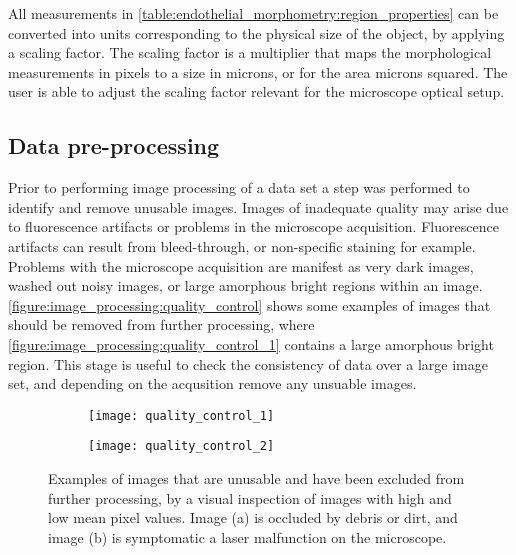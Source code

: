 All measurements in \autoref{table:endothelial_morphometry:region_properties} can be converted into units corresponding to the physical size of the object, by applying a scaling factor. The scaling factor is a multiplier that maps the morphological measurements in pixels to a size in microns, or for the area microns squared. The user is able to adjust the scaling factor relevant for the microscope optical setup.

\subsection{Data pre-processing}
\label{endothelial_morphometry:image_processing:data_preprocessing}
Prior to performing image processing of a data set a step was performed to identify and remove unusable images. Images of inadequate quality may arise due to fluorescence artifacts or problems in the microscope acquisition. Fluorescence artifacts can result from bleed-through, or non-specific staining for example. Problems with the microscope acquisition are manifest as very dark images, washed out noisy images, or large amorphous bright regions within an image. \autoref{figure:image_processing:quality_control} shows some examples of images that should be removed from further processing, where \autoref{figure:image_processing:quality_control_1} contains a large amorphous bright region. This stage is useful to check the consistency of data over a large image set, and depending on the acqusition remove any unsuable images.

\begin{figure}[htbp]\centering
	\begin{subfigure}[b]{0.49\linewidth} %
		\centering
		\texttt{[image: quality\_control\_1]}
		\caption{}
		\label{figure:image_processing:quality_control_1}
		\vspace{1ex} \end{subfigure} \begin{subfigure}[b]{0.49\linewidth} %
		\centering
		\texttt{[image: quality\_control\_2]}
		\caption{}
		\label{figure:image_processing:quality_control_2}
		\vspace{1ex}
	\end{subfigure}
\caption[Examples of images excluded from high-throughput analysis]{Examples of images that are unusable and have been excluded from further processing, by a visual inspection of images with high and low mean pixel values. Image (a) is occluded by debris or dirt, and image (b) is symptomatic a laser malfunction on the microscope.}
\label{figure:image_processing:quality_control}
\end{figure}

